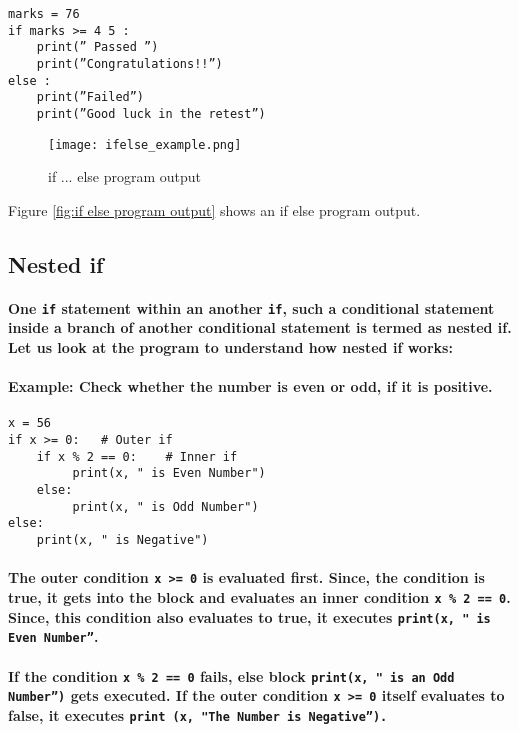 \documentclass{book}
\begin{document}
\begin{verbatim}
marks = 76
if marks >= 4 5 :
    print(” Passed ”)
    print(”Congratulations!!”)
else :
    print(”Failed”)
    print(”Good luck in the retest”)
\end{verbatim}

\begin{figure}
  \texttt{[image: ifelse\_example.png]}
  \caption{if ... else program output}
  \label{fig:if ... else program output}
\end{figure}

Figure \ref{fig:if else program output} shows an if else program output.


\subsection*{Nested if}

\paragraph{One \texttt{if} statement within an another \texttt{if}, such a conditional statement inside a branch of another conditional statement is termed as nested if. Let us look at the program to understand how nested if
works:}
\paragraph{Example: Check whether the number is even or odd, if it is positive.}

\begin{verbatim}
x = 56
if x >= 0:   # Outer if
    if x % 2 == 0:    # Inner if
         print(x, " is Even Number")
    else:
         print(x, " is Odd Number")
else:
    print(x, " is Negative")
\end{verbatim}

\paragraph{The outer condition \texttt{x >= 0} is evaluated first. Since, the condition is true, it gets into the block and evaluates an inner condition \texttt{x \% 2 == 0}. Since, this condition also evaluates to true, it executes \texttt{print(x, " is Even Number”}.}
\paragraph{If the condition \texttt{x \% 2 == 0} fails, else block \texttt{print(x, " is an Odd Number”)} gets executed. If the outer condition \texttt{x >= 0} itself evaluates to false, it executes \texttt{print (x, "The Number is Negative”).}}
\end{document}
